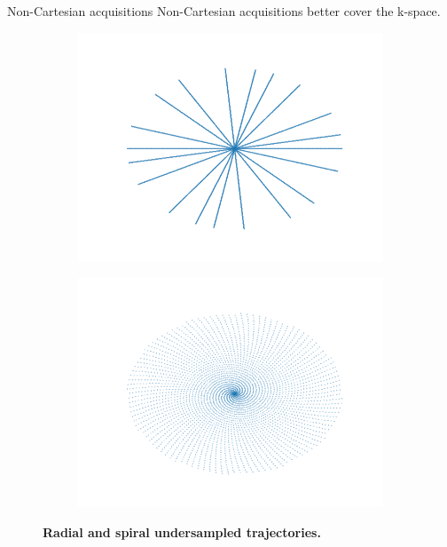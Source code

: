 \begin{frame}{Non-Cartesian acquisitions}
    Non-Cartesian acquisitions better cover the k-space.
    \pause
    \vspace{-1ex}
    \begin{figure}
        \centering
        \begin{subfigure}{0.48\textwidth}
            \includegraphics[height=0.48\textheight]{Figures/dl_mri_figures/radial_trajectory.png}
        \end{subfigure}
        \begin{subfigure}{0.48\textwidth}
            \includegraphics[height=0.48\textheight]{Figures/dl_mri_figures/spiral_trajectory.png}
        \end{subfigure}
        \caption{\textbf{Radial and spiral undersampled trajectories.}}
    \end{figure}
    \pause


\end{frame}
